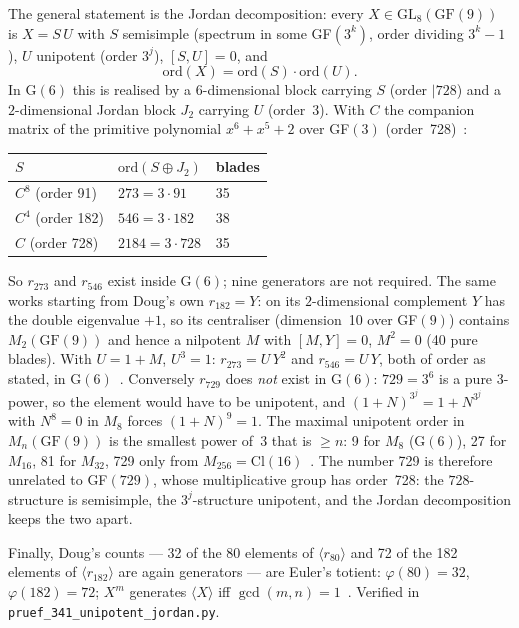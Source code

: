 The general statement is the Jordan decomposition: every $X\in\mathrm{GL}_8(\text{GF}(9))$
is $X=S\,U$ with $S$ semisimple (spectrum in some GF$(3^k)$, order dividing $3^k-1$),
$U$ unipotent (order $3^j$), $[S,U]=0$, and
\begin{equation}
  \mathrm{ord}(X)=\mathrm{ord}(S)\cdot\mathrm{ord}(U).
\end{equation}
In G$(6)$ this is realised by a $6$-dimensional block carrying $S$ (order $\mid 728$)
and a $2$-dimensional Jordan block $J_2$ carrying $U$ (order~3). With $C$ the companion
matrix of the primitive polynomial $x^6+x^5+2$ over GF$(3)$ (order~728)~\BM:
\begin{center}
\begin{tabular}{lll}
\toprule
$S$ & $\mathrm{ord}(S\oplus J_2)$ & blades \\
\midrule
$C^8$ (order 91)  & $273 = 3\cdot 91$   & 35 \\
$C^4$ (order 182) & $546 = 3\cdot 182$  & 38 \\
$C$ (order 728)   & $2184 = 3\cdot 728$ & 35 \\
\bottomrule
\end{tabular}
\end{center}
So $r_{273}$ and $r_{546}$ exist inside G$(6)$; nine generators are not required.
The same works starting from Doug's own $r_{182}=Y$: on its $2$-dimensional
complement $Y$ has the double eigenvalue $+1$, so its centraliser (dimension~10
over GF$(9)$) contains $M_2(\text{GF}(9))$ and hence a nilpotent $M$ with
$[M,Y]=0$, $M^2=0$ (40 pure blades). With $U=1+M$, $U^3=1$:
$r_{273}=U\,Y^2$ and $r_{546}=U\,Y$, both of order as stated, in G$(6)$~\BM.
Conversely $r_{729}$ does \emph{not} exist in G$(6)$: $729=3^6$ is a pure 3-power,
so the element would have to be unipotent, and $(1+N)^{3^j}=1+N^{3^j}$ with $N^8=0$
in $M_8$ forces $(1+N)^9=1$. The maximal unipotent order in $M_n(\text{GF}(9))$ is the
smallest power of~3 that is $\ge n$: 9 for $M_8$ (G$(6)$), 27 for $M_{16}$, 81 for
$M_{32}$, 729 only from $M_{256}=\mathrm{Cl}(16)$~\BM. The number 729 is therefore
unrelated to GF$(729)$, whose multiplicative group has order~728: the $728$-structure
is semisimple, the $3^j$-structure unipotent, and the Jordan decomposition keeps the two apart.

Finally, Doug's counts --- 32 of the 80 elements of $\langle r_{80}\rangle$ and 72 of
the 182 elements of $\langle r_{182}\rangle$ are again generators --- are Euler's
totient: $\varphi(80)=32$, $\varphi(182)=72$; $X^m$ generates $\langle X\rangle$ iff
$\gcd(m,n)=1$~\BM. Verified in \texttt{pruef\_341\_unipotent\_jordan.py}.

